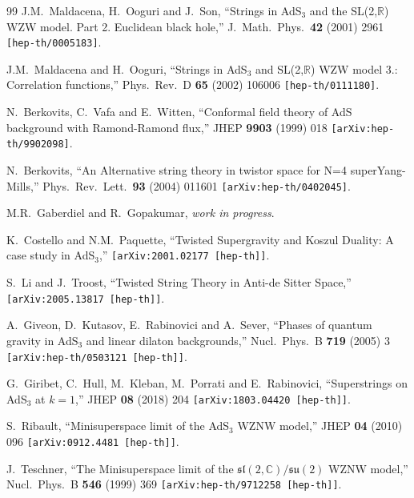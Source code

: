 \documentclass[a4paper,11pt]{article}
\numberwithin{equation}{section}
\begin{document}
\begin{thebibliography}{99}
J.M.~Maldacena, H.~Ooguri and J.~Son,
``Strings in AdS$_3$ and the SL(2,$\mathbb{R}$) WZW model. Part 2. Euclidean black hole,''
J.\ Math.\ Phys.\  {\bf 42} (2001) 2961
{\tt [hep-th/0005183]}.

J.M.~Maldacena and H.~Ooguri,
``Strings in AdS$_3$ and SL(2,$\mathbb{R}$) WZW model 3.: Correlation functions,''
Phys.\ Rev.\ D {\bf 65} (2002) 106006
{\tt [hep-th/0111180]}.

N.~Berkovits, C.~Vafa and E.~Witten,
``Conformal field theory of AdS background with Ramond-Ramond flux,''
JHEP {\bf 9903} (1999) 018
{\tt [arXiv:hep-th/9902098]}.

N.~Berkovits,
``An Alternative string theory in twistor space for N=4 superYang-Mills,''
Phys.\ Rev.\ Lett.\  {\bf 93} (2004) 011601
{\tt [arXiv:hep-th/0402045]}.

M.R.~Gaberdiel and R.~Gopakumar, {\it work in progress}.

K.~Costello and N.M.~Paquette,
``Twisted Supergravity and Koszul Duality: A case study in AdS$_3$,''
{\tt [arXiv:2001.02177 [hep-th]]}.

S.~Li and J.~Troost,
``Twisted String Theory in Anti-de Sitter Space,''
{\tt [arXiv:2005.13817 [hep-th]]}.

A.~Giveon, D.~Kutasov, E.~Rabinovici and A.~Sever,
``Phases of quantum gravity in AdS$_3$ and linear dilaton backgrounds,''
Nucl.\ Phys.\ B \textbf{719} (2005)  3 %
{\tt [arXiv:hep-th/0503121 [hep-th]]}.

G.~Giribet, C.~Hull, M.~Kleban, M.~Porrati and E.~Rabinovici,
``Superstrings on AdS$_{3}$ at $k = 1$,''
JHEP \textbf{08} (2018) 204
{\tt [arXiv:1803.04420 [hep-th]]}.

S.~Ribault,
``Minisuperspace limit of the AdS$_3$ WZNW model,''
JHEP \textbf{04} (2010) 096
{\tt [arXiv:0912.4481 [hep-th]]}.

J.~Teschner,
``The Minisuperspace limit of the $\mathfrak{sl}(2,\mathbb{C}) / \mathfrak{su}(2)$ WZNW model,''
Nucl.\ Phys.\ B \textbf{546} (1999) 369 %
{\tt [arXiv:hep-th/9712258 [hep-th]]}.


\end{thebibliography}
\end{document}
